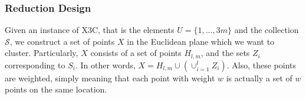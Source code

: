 \documentclass{article}
\newcommand{\mc}{\mathcal}
\begin{document}
  
  
  


%


\subsubsection{Reduction Design}
Given an instance of X3C, that is the elements $U = \{1, \ldots, 3m\}$ and the collection $\mc S$, we construct a set of points $X$ in the Euclidean plane which we want to cluster. Particularly, $X$ consists of a set of points $H_{l,m}$, and the sets $Z_i$ corresponding to $S_i$. In other words, $X = H_{l,m} \cup (\cup_{i=1}^l Z_i)$. Also, these points are weighted, simply meaning that each point with weight $w$ is actually a set of $w$ points on the same location.
\end{document}

